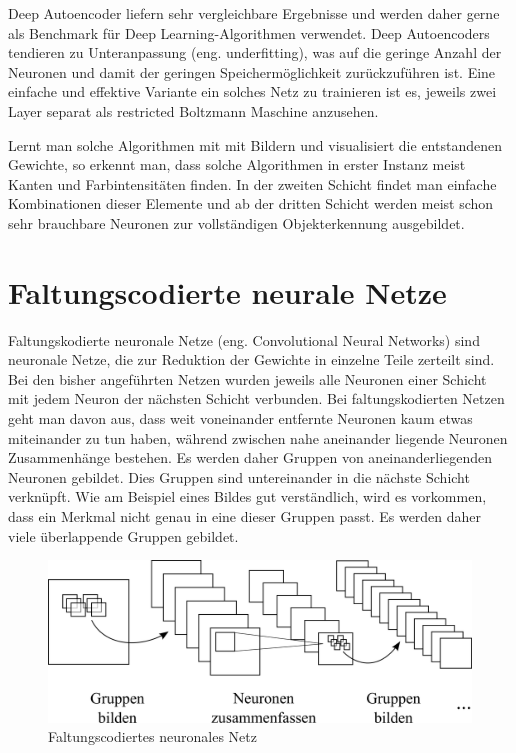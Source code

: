 Deep Autoencoder liefern sehr vergleichbare Ergebnisse und werden daher gerne als Benchmark für Deep Learning-Algorithmen verwendet. Deep Autoencoders tendieren zu Unteranpassung (eng. underfitting), was auf die geringe Anzahl der Neuronen und damit der geringen Speichermöglichkeit zurückzuführen ist. Eine einfache und effektive Variante ein solches Netz zu trainieren ist es, jeweils zwei Layer separat als restricted Boltzmann Maschine anzusehen.

Lernt man solche Algorithmen mit mit Bildern und visualisiert die entstandenen Gewichte, so erkennt man, dass solche Algorithmen in erster Instanz meist Kanten und Farbintensitäten finden. In der zweiten Schicht findet man einfache Kombinationen dieser Elemente und ab der dritten Schicht werden meist schon sehr brauchbare Neuronen zur vollständigen Objekterkennung ausgebildet.

\section{Faltungscodierte neurale Netze}

Faltungskodierte neuronale Netze (eng. Convolutional Neural Networks) sind neuronale Netze, die zur Reduktion der Gewichte in einzelne Teile zerteilt sind. Bei den bisher angeführten Netzen wurden jeweils alle Neuronen einer Schicht mit jedem Neuron der nächsten Schicht verbunden. Bei faltungskodierten Netzen geht man davon aus, dass weit voneinander entfernte Neuronen kaum etwas miteinander zu tun haben, während zwischen nahe aneinander liegende Neuronen Zusammenhänge bestehen. Es werden daher Gruppen von aneinanderliegenden Neuronen gebildet. Dies Gruppen sind untereinander in die nächste Schicht verknüpft. Wie am Beispiel eines Bildes gut verständlich, wird es vorkommen, dass ein Merkmal nicht genau in eine dieser Gruppen passt. Es werden daher viele überlappende Gruppen gebildet.

\begin{figure}
	\centering
	\includegraphics[scale=1]{images/convolution.png}
	\caption{Faltungscodiertes neuronales Netz}
	\label{fig:convolution}
\end{figure}

